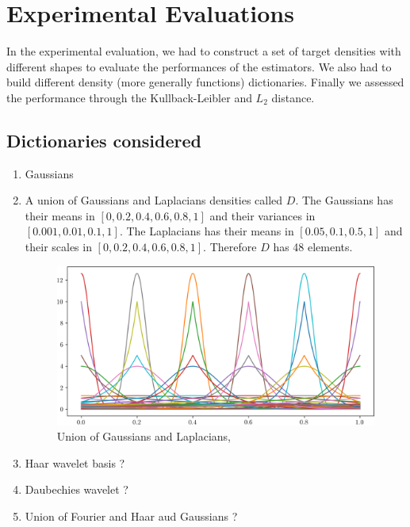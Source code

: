 \section{Experimental Evaluations}

In the experimental evaluation, we had to construct a set of target densities with different shapes to evaluate the performances of the estimators. We also had to build different density (more generally functions) dictionaries. Finally we assessed the performance through the Kullback-Leibler and $L_2$ distance.

\subsection{Dictionaries considered}
\begin{enumerate}
\item Gaussians
\item A union of Gaussians and Laplacians densities called $D$. The Gaussians has their means in $[0, 0.2, 0.4, 0.6, 0.8, 1]$ and their variances in $[0.001, 0.01, 0.1, 1]$. The Laplacians has their means in $[0.05, 0.1, 0.5, 1]$ and their scales in $[0, 0.2, 0.4, 0.6, 0.8, 1]$. Therefore $D$ has 48 elements.

\begin{figure}
\centering
\includegraphics[width=1\textwidth]{TeX_files/lapl_gauss_dict.png}
\caption{Union of Gaussians and Laplacians,}
\end{figure}
\item Haar wavelet basis ?
\item Daubechies wavelet ?
\item Union of Fourier and Haar aud Gaussians ?
\end{enumerate}


